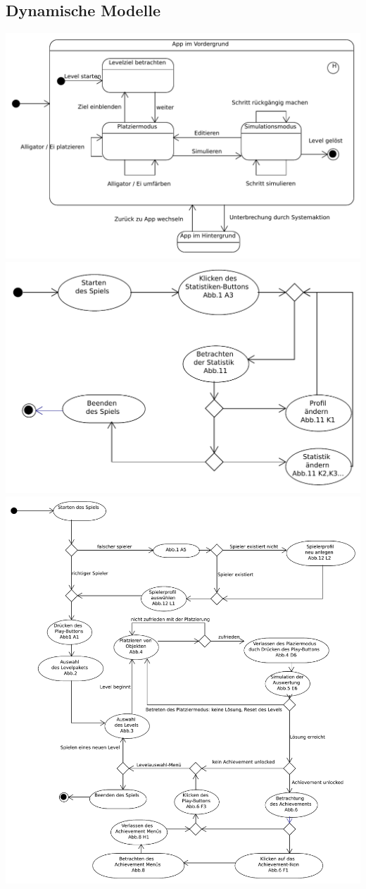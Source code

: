 \subsection{Dynamische Modelle}
\clearpage
\includegraphics[scale=0.6]{Systemmodelle/game_state.pdf}
\clearpage
\includegraphics[scale=0.6]{Systemmodelle/parent_activity.pdf}
\clearpage
\includegraphics[scale=0.6]{Systemmodelle/start_activity.pdf}
